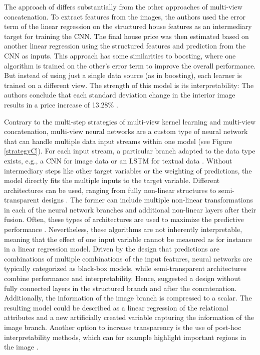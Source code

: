 \documentclass[letterpaper]{article}
\begin{document}
The approach of \citeauthor{naumzik2020one} \citeyearpar{naumzik2020one} differs substantially from the other approaches of multi-view concatenation. To extract features from the images, the authors used the error term of the linear regression on the structured house features as an intermediary target for training the CNN. The final house price was then estimated based on another linear regression using the structured features and prediction from the CNN as inputs. This approach has some similarities to boosting, where one algorithm is trained on the other's error term to improve the overall performance. But instead of using just a single data source (as in boosting), each learner is trained on a different view. The strength of this model is its interpretability: The authors conclude that each standard deviation change in the interior image results in a price increase of 13.28\% \cite{naumzik2020one}.

Contrary to the multi-step strategies of multi-view kernel learning and multi-view concatenation, multi-view neural networks are a custom type of neural network that can handle multiple data input streams within one model (see Figure \ref{strategyC}). For each input stream, a particular branch adapted to the data type exists, e.g., a CNN for image data or an LSTM for textual data \cite{li2018survey}. Without intermediary steps like other target variables or the weighting of predictions, the model directly fits the multiple inputs to the target variable. Different architectures can be used, ranging from fully non-linear structures to semi-transparent designs \cite{law2019take}. The former can include multiple non-linear transformations in each of the neural network branches and additional non-linear layers after their fusion. Often, these types of architectures are used to maximize the predictive performance \cite{law2019take}. Nevertheless, these algorithms are not inherently interpretable, meaning that the effect of one input variable cannot be measured as for instance in a linear regression model. Driven by the design that predictions are combinations of multiple combinations of the input features, neural networks are typically categorized as black-box models, while semi-transparent architectures combine performance and interpretability. Hence, \citeauthor{law2019take} suggested a design without fully connected layers in the structured branch and after the concatenation. Additionally, the information of the image branch is compressed to a scalar. The resulting model could be described as a linear regression of the relational attributes and a new artificially created variable capturing the information of the image branch. Another option to increase transparency is the use of post-hoc interpretability methods, which can for example highlight important regions in the image \cite{kucklick2020location}.
\end{document}
